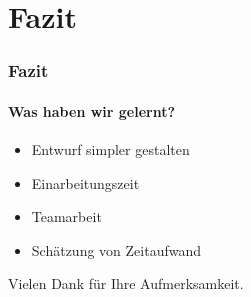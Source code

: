 \documentclass[t]{beamer}
\begin{document}
\section{Fazit}
\begin{frame}[c]
	\frametitle{Fazit}
	\framesubtitle{Was haben wir gelernt?}
	\begin{itemize}
	\itemsep1em
	\item <+-> Entwurf simpler gestalten
	\item <+-> Einarbeitungszeit
	\item <+-> Teamarbeit
	\item <+-> Schätzung von Zeitaufwand
	\end{itemize}
\end{frame}
\begin{frame}[c]
	\begin{center}
	Vielen Dank für Ihre Aufmerksamkeit.
	\end{center}
\end{frame}
\end{document}
